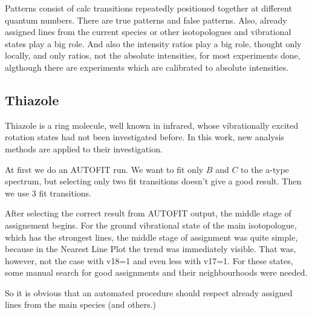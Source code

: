 \documentclass[11pt]{article}
\begin{document}
Patterns consist of calc transitions repeatedly positioned together at different quantum numbers. There are true patterns and false patterns. Also, already assigned lines from the current species or other isotopologues and vibrational states play a big role. And also the intensity ratios play a big role, thought only locally, and only ratios, not the absolute intensities, for most experiments done, algthough there are experiments which are calibrated to absolute intensities.
 
\subsection{Thiazole}

Thiazole is a ring molecule, well known in infrared, whose vibrationally excited rotation states had not been investigated before. In this work, new analysis methods are applied to their investigation.

At first we do an AUTOFIT run. We want to fit only $B$ and $C$ to the a-type spectrum, but selecting only two fit transitions doesn't give a good result.  Then we use $3$ fit transitions. 

After selecting the correct result from AUTOFIT output, the middle stage of assignement begins. For the ground vibrational state of the main isotopologue, which has the strongest lines, the middle stage of assignment was quite simple, because in the Nearest Line Plot the trend was immediately visible. That was, however, not the case with v18=1 and even less with v17=1. For these states, some manual search for good assignments and their neighbourhoods were needed.

So it is obvious that an automated procedure should respect already assigned lines from the main species (and others.)

\end{document}
